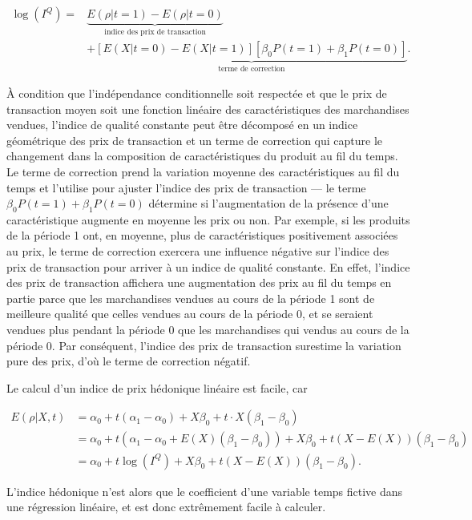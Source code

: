 \documentclass[]{article}
\begin{document}
\begin{align*}
\log (I^{Q}) =& \underbrace{E(\rho | t = 1) - E(\rho | t = 0)}_{\text{indice des prix de transaction}} \\
& + \underbrace{[E(X | t = 0) - E(X | t = 1)] [\beta_{0} P (t = 1) + \beta_{1} P (t = 0)]}_{\text{terme de correction}}.
\end{align*}

À condition que l'indépendance conditionnelle soit respectée et que le prix de transaction moyen soit une fonction linéaire des caractéristiques des marchandises vendues, l'indice de qualité constante peut être décomposé en un indice géométrique des prix de transaction et un terme de correction qui capture le changement dans la composition de caractéristiques du produit au fil du temps. Le terme de correction prend la variation moyenne des caractéristiques au fil du temps et l'utilise pour ajuster l'indice des prix de transaction --- le terme \(\beta_{0} P(t = 1) + \beta_{1} P(t = 0)\) détermine si l'augmentation de la présence d'une caractéristique augmente en moyenne les prix ou non. Par exemple, si les produits de la période 1 ont, en moyenne, plus de caractéristiques positivement associées au prix, le terme de correction exercera une influence négative sur l'indice des prix de transaction pour arriver à un indice de qualité constante. En effet, l'indice des prix de transaction affichera une augmentation des prix au fil du temps en partie parce que les marchandises vendues au cours de la période 1 sont de meilleure qualité que celles vendues au cours de la période 0, et se seraient vendues plus pendant la période 0 que les marchandises qui vendus au cours de la période 0. Par conséquent, l'indice des prix de transaction surestime la variation pure des prix, d'où le terme de correction négatif.

Le calcul d'un indice de prix hédonique linéaire est facile, car

\begin{align*}
E(\rho | X, t) &= \alpha_{0} + t (\alpha_{1} - \alpha_{0}) + X \beta_{0} + t \cdot X (\beta_{1} - \beta_{0}) \\
&= \alpha_{0} + t (\alpha_{1} - \alpha_{0} + E(X) (\beta_{1} - \beta_{0})) + X \beta_{0} + t ( X - E(X)) (\beta_{1} - \beta_{0}) \\
&= \alpha_{0} + t \log (I^{Q}) + X \beta_{0} + t (X - E(X)) (\beta_{1} - \beta_{0}).
\end{align*}

L'indice hédonique n'est alors que le coefficient d'une variable temps fictive dans une régression linéaire, et est donc extrêmement facile à calculer.
\end{document}
